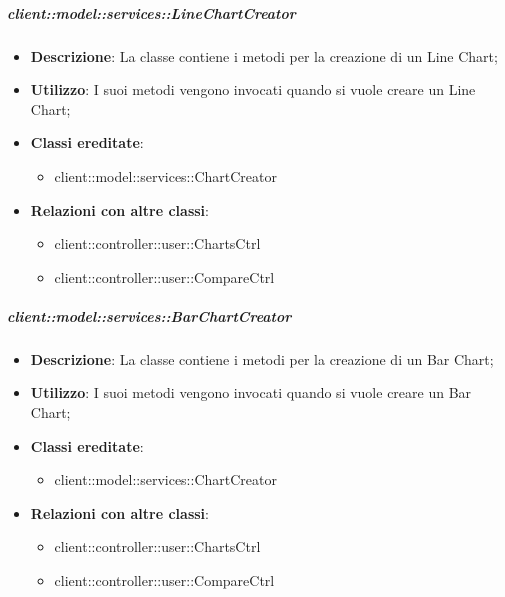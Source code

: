 		\subparagraph{client::model::services::LineChartCreator} %
		\label{subp:linechartcreator}
			\begin{itemize}
				\item \textbf{Descrizione}: La classe contiene i metodi per la creazione di un Line Chart;
				\item \textbf{Utilizzo}: I suoi metodi vengono invocati quando si vuole creare un Line Chart;
				\item \textbf{Classi ereditate}:
					\begin{itemize}
						\item client::model::services::ChartCreator
					\end{itemize}
				\item \textbf{Relazioni con altre classi}:
					\begin{itemize}
						\item client::controller::user::ChartsCtrl
						\item client::controller::user::CompareCtrl
					\end{itemize}
			\end{itemize}


		\subparagraph{client::model::services::BarChartCreator} %
		\label{subp:barchartcreator}
			\begin{itemize}
				\item \textbf{Descrizione}: La classe contiene i metodi per la creazione di un Bar Chart;
				\item \textbf{Utilizzo}: I suoi metodi vengono invocati quando si vuole creare un Bar Chart;
				\item \textbf{Classi ereditate}:
					\begin{itemize}
						\item client::model::services::ChartCreator
					\end{itemize}
				\item \textbf{Relazioni con altre classi}:
					\begin{itemize}
						\item client::controller::user::ChartsCtrl
						\item client::controller::user::CompareCtrl
					\end{itemize}
			\end{itemize}

